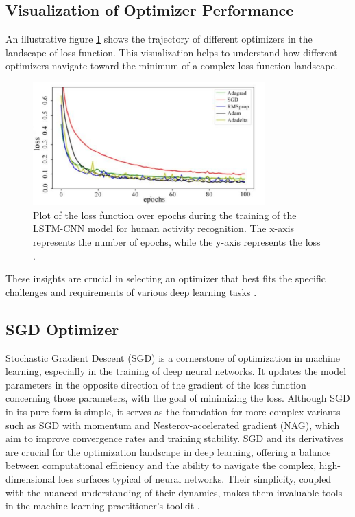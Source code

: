 \newpage

\subsection{Visualization of Optimizer Performance}
An illustrative figure \ref{fig:optimizer_landscape} shows the trajectory of different optimizers in the landscape of loss function. This visualization helps to understand how different optimizers navigate toward the minimum of a complex loss function landscape.
\begin{figure}[ht]
    \centering
    \includegraphics[width=0.8\textwidth]{obrazky-figures/optimizers_evaluation.png}
    \caption{Plot of the loss function over epochs during the training of the LSTM-CNN model for human activity recognition. The x-axis represents the number of epochs, while the y-axis represents the loss \cite{xia2020lstm}.}
    \label{fig:optimizer_landscape}
\end{figure}

These insights are crucial in selecting an optimizer that best fits the specific challenges and requirements of various deep learning tasks \cite{Perin2020Influence}.

\newpage

\subsection{SGD Optimizer}

Stochastic Gradient Descent (SGD) is a cornerstone of optimization in machine learning, especially in the training of deep neural networks. It updates the model parameters in the opposite direction of the gradient of the loss function concerning those parameters, with the goal of minimizing the loss. Although SGD in its pure form is simple, it serves as the foundation for more complex variants such as SGD with momentum and Nesterov-accelerated gradient (NAG), which aim to improve convergence rates and training stability. SGD and its derivatives are crucial for the optimization landscape in deep learning, offering a balance between computational efficiency and the ability to navigate the complex, high-dimensional loss surfaces typical of neural networks. Their simplicity, coupled with the nuanced understanding of their dynamics, makes them invaluable tools in the machine learning practitioner's toolkit
\cite{Perin2020Influence}.

